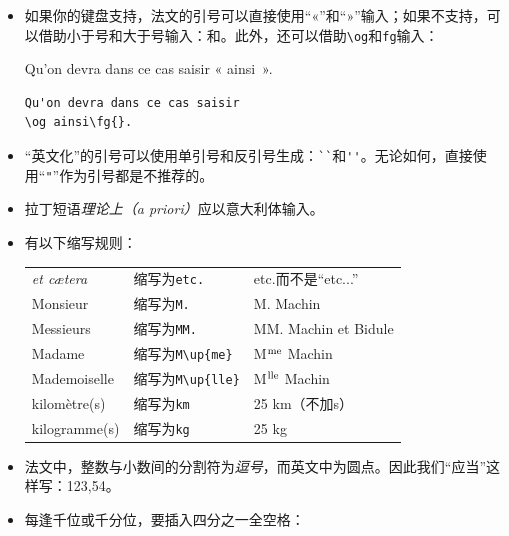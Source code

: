 \begin{itemize}
    \item 如果你的键盘支持，法文的引号可以直接使用``«''和``»''输入；如果不支持，可以借助小于号和大于号输入：\dm{<<}和\dm{>>}。此外，还可以借助\verb|\og|和\verb|fg|输入：
    
\begin{codelist}[7.3]{
    Qu'on devra dans ce cas saisir « ainsi~».
}
\begin{verbatim}
Qu'on devra dans ce cas saisir
\og ainsi\fg{}.\end{verbatim}
\end{codelist}

    \item ``英文化''的引号可以使用单引号和反引号生成：\verb|``|和\verb|''|。无论如何，直接使用``\verb|"|''作为引号都是不推荐的。
    
    \item 拉丁短语\emph{理论上（a priori）}应以意大利体输入。
    
    \item 有以下缩写规则：

    \begin{center}
        \begin{tabular}{|l|l|l|}
            \hline
            \emph{et cætera} & 缩写为\quad \verb|etc.| & etc.而不是``etc...'' \\
            Monsieur & 缩写为\quad \verb|M.| & M. Machin \\
            Messieurs & 缩写为\quad \verb|MM.| & MM. Machin et Bidule\\
            Madame & 缩写为\quad \verb|M\up{me}| & M$^{\rm me}$ Machin\\
            Mademoiselle & 缩写为\quad \verb|M\up{lle}| & M$^{\rm lle}$ Machin\\
            kilomètre(s) & 缩写为\quad \verb|km| & 25 km（不加s）\\
            kilogramme(s) & 缩写为\quad \verb|kg| & 25 kg\\
            \hline
        \end{tabular}
    \end{center}

    \item 法文中，整数与小数间的分割符为\emph{逗号}，而英文中为圆点。因此我们``应当''这样写：123,54。
    
    \item 每逢千位或千分位，要插入四分之一全空格：
    

\end{itemize}
